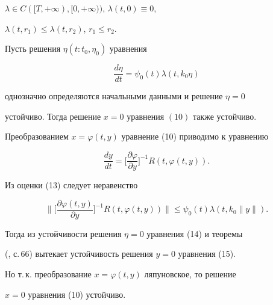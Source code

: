 $\lambda\in C([T,+\infty),[0,+\infty))$, $\lambda(t,0)\equiv 0$, 


$\lambda(t,r_1)\le\lambda(t,r_2)$, $r_1\le r_2$. 


 


\begin{thm} 


Пусть решения $\eta(t:t_0,\eta_0)$ уравнения 


\begin{equation} 


\frac{d\eta}{dt}=\psi_0(t)\lambda(t,k_0\eta) 


\end{equation} 


однозначно определяются начальными данными и решение $\eta=0$ 


устойчиво. Тогда решение $x=0$ уравнения $(10)$ также устойчиво. 


\end{thm} 


 


\begin{pf} 


Преобразованием $x=\varphi(t,y)$ уравнение (10) приводимо к уравнению 


\begin{equation} 


\frac{dy}{dt}=\biggl[\frac{\partial\varphi}{\partial y} 


\biggr]^{-1}R(t,\varphi(t,y)). 


\end{equation} 


Из оценки (13) следует неравенство 


$$ 


\biggl\|\biggl[\frac{\partial\varphi(t,y)}{\partial y} 


\biggr]^{-1}R(t,\varphi(t,y))\biggr\|\le\psi_0(t) 


\lambda(t,k_0\|y\|). 


$$ 


Тогда из устойчивости решения $\eta=0$ уравнения (14) и теоремы 


(\cite{4}, с.\,66) вытекает устойчивость решения $y=0$ уравнения (15). 


Но т.\,к. преобразование $x=\varphi(t,y)$ ляпуновское, то решение 


$x=0$ уравнения (10) устойчиво. 


\end{pf} 


